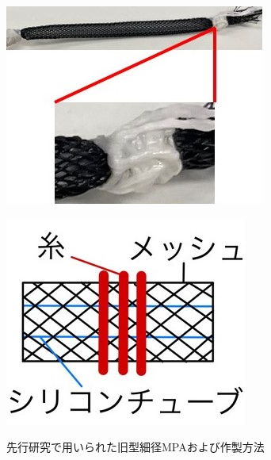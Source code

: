 \begin{figure}[!hb]
  \begin{minipage}{0.49\hsize}
    \centering  
    \includegraphics[scale=0.5]{image/MPA_tanbu_1_1.jpg}
    \label{fig:MPA_tanbu_1_1}
  \end{minipage}
  \begin{minipage}{0.5\hsize}
    \centering
    \includegraphics[scale=0.5]{image/MPA_tanbu_1_2.jpg}
    \label{fig:MPA_tanbu_1_2}
  \end{minipage}
  \caption{先行研究で用いられた旧型細径MPAおよび作製方法}
  \label{fig:MPA_tanbu_1}
\end{figure}
%
